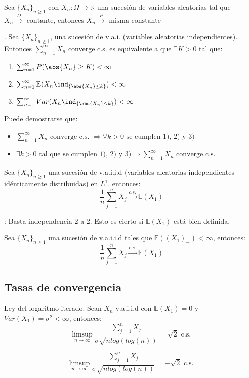 \documentclass{apuntes}
\begin{document}
\begin{theorem}
Sea $\{X_n\}_{n \geq 1}$ con $X_n: \Omega \rightarrow \mathbb{R}$ una sucesión de variables aleatorias tal que $X_n \stackrel{D}{\rightarrow} \text{ contante}$, entonces $X_n \stackrel{P}{\rightarrow} \text{ misma constante }$
\end{theorem}

\begin{theorem}.
Sea $\{X_n\}_{n\geq 1}$, una sucesión de v.a.i. (variables aleatorias independientes). Entonces $\sum_{n=1}^{\infty} X_n$ converge c.s. es equivalente a que $\exists K >0$ tal que:
\begin{enumerate}
\item $\sum_{n=1}^{\infty} P(\abs{X_n}\geq K)<\infty$
\item $\sum_{n=1}^{\infty} \mathbb{E}(X_n \ind_{\{\abs{X_n}\leq k\}}) <\infty$
\item $\sum_{n=1}^{\infty} Var(X_n \ind_{\{\abs{X_n}\leq k\}}) <\infty$
\end{enumerate}
Puede demostrarse que:
\begin{itemize}
\item $\sum_{n=1}^{\infty} X_n \text{ converge c.s. }  \Rightarrow \forall k>0 \text{ se cumplen 1), 2) y 3)}$
\item $\exists k>0 \text{ tal que se cumplen 1), 2) y 3)} \Rightarrow \sum_{n=1}^{\infty} X_n \text{ converge c.s. } $
\end{itemize}
\end{theorem}

\begin{theorem}
Sea $\{X_n\}_{n\geq 1}$ una sucesión de v.a.i.i.d (variables aleatorias independientes idénticamente distribuidas) en $L^1$. entonces:
\[
\frac{1}{n}\sum_{j=1}^{n}X_j \stackrel{c.s.}{\rightarrow} \mathbb{E}(X_1)
\]

\obs: Basta independencia 2 a 2. Esto es cierto si $\mathbb{E}(X_1)$ está bien definida.
\end{theorem}

\begin{theorem}
Sea $\{X_n\}_{n \geq 1}$ una sucesión de v.a.i.i.d tales que $\mathbb{E}((X_1)_-) < \infty$, entonces:
\[
\frac{1}{n}\sum_{j=1}^{n}X_j \stackrel{c.s.}{\rightarrow} \mathbb{E}(X_1)
\]
\end{theorem}

\subsection{Tasas de convergencia}
\begin{defn}
Ley del logaritmo iterado. Sean $X_n$ v.a.i.i.d con $\mathbb{E}(X_1)=0$ y $Var(X_1)=\sigma^2<\infty$, entonces:
\[
\limsup_{n \rightarrow \infty} \frac{\sum_{j=1}^{n} X_j}{\sigma \sqrt{nlog(log(n))}}=\sqrt{2} \text{ c.s. }
\]

\obs
\[
\limsup_{n \rightarrow \infty} \frac{\sum_{j=1}^{n} X_j}{\sigma \sqrt{nlog(log(n))}}=-\sqrt{2} \text{ c.s. }
\]
\end{defn}
\end{document}
